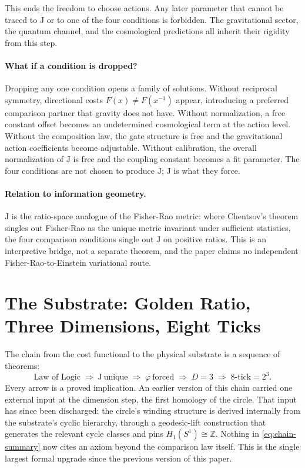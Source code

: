 \documentclass[11pt,letterpaper]{article}
\theoremstyle{definition}
\newcommand{\J}{\mathrm{J}}
\newcommand{\phiG}{\varphi}
\begin{document}
This ends the freedom to choose actions.  Any later parameter that
cannot be traced to $\J$ or to one of the four conditions is forbidden.
The gravitational sector, the quantum channel, and the cosmological
predictions all inherit their rigidity from this step.

\paragraph{What if a condition is dropped?}
Dropping any one condition opens a family of solutions.  Without
reciprocal symmetry, directional costs $F(x)\neq F(x^{-1})$ appear,
introducing a preferred comparison partner that gravity does not have.
Without normalization, a free constant offset becomes an undetermined
cosmological term at the action level.  Without the composition law,
the gate structure is free and the gravitational action coefficients
become adjustable.  Without calibration, the overall normalization of
$\J$ is free and the coupling constant becomes a fit parameter.  The
four conditions are not chosen to produce $\J$; $\J$ is what they
force.

\paragraph{Relation to information geometry.}
$\J$ is the ratio-space analogue of the Fisher-Rao metric: where
Chentsov's theorem singles out Fisher-Rao as the unique metric
invariant under sufficient statistics, the four comparison conditions
single out $\J$ on positive ratios.  This is an interpretive bridge,
not a separate theorem, and the paper claims no independent
Fisher-Rao-to-Einstein variational route.

\section{The Substrate: Golden Ratio, Three Dimensions, Eight Ticks}
\label{sec:chain}

The chain from the cost functional to the physical substrate is a
sequence of theorems:
\begin{equation}\label{eq:chain-summary}
\boxed{\;
\text{Law of Logic}
\;\Longrightarrow\;
\J\ \text{unique}
\;\Longrightarrow\;
\phiG\ \text{forced}
\;\Longrightarrow\;
D=3
\;\Longrightarrow\;
8\text{-tick}=2^3 .
\;}
\end{equation}
Every arrow is a proved implication.  An earlier version of this chain
carried one external input at the dimension step, the first homology of
the circle.  That input has since been discharged: the circle's winding
structure is derived internally from the substrate's cyclic hierarchy,
through a geodesic-lift construction that generates the relevant cycle
classes and pins $H_1(S^1)\cong\mathbb{Z}$.  Nothing in
\eqref{eq:chain-summary} now cites an axiom beyond the comparison law
itself.  This is the single largest formal upgrade since the previous
version of this paper.
\end{document}
